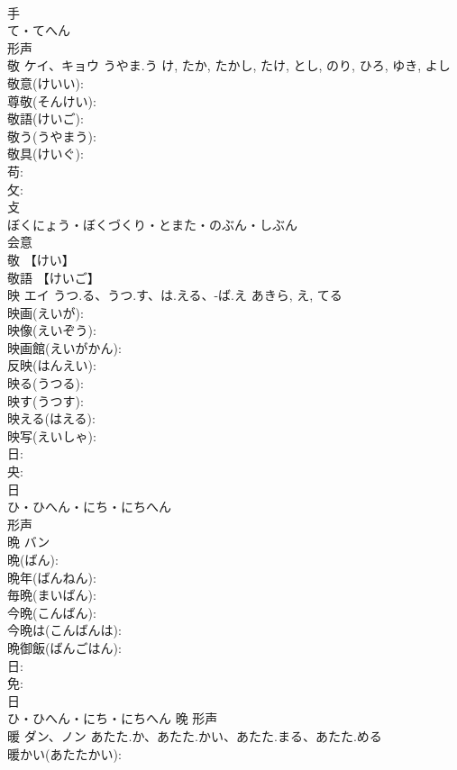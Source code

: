 \documentclass[8pt]{extreport}
\begin{document}
\begin{CJK}{UTF8}{min}
\\	手	
\\	て・てへん	
\\	形声 
\\	敬	ケイ、キョウ	うやま.う	け, たか, たかし, たけ, とし, のり, ひろ, ゆき, よし	
\\	敬意(けいい): 
\\	尊敬(そんけい): 
\\	敬語(けいご): 
\\	敬う(うやまう): 
\\	敬具(けいぐ): 
\\	苟: 
\\	攵: 
\\	攴	
\\	ぼくにょう・ぼくづくり・とまた・のぶん・しぶん	
\\	会意 
\\	敬 【けい】 
\\	敬語 【けいご】 
\\	映	エイ	うつ.る、うつ.す、は.える、-ば.え	あきら, え, てる	
\\	映画(えいが): 
\\	映像(えいぞう): 
\\	映画館(えいがかん): 
\\	反映(はんえい): 
\\	映る(うつる): 
\\	映す(うつす): 
\\	映える(はえる): 
\\	映写(えいしゃ): 
\\	日: 
\\	央: 
\\	日	
\\	ひ・ひへん・にち・にちへん	
\\	形声 
\\	晩	バン			
\\	晩(ばん): 
\\	晩年(ばんねん): 
\\	毎晩(まいばん): 
\\	今晩(こんばん): 
\\	今晩は(こんばんは): 
\\	晩御飯(ばんごはん): 
\\	日: 
\\	免: 
\\	日	
\\	ひ・ひへん・にち・にちへん	晚	形声 
\\	暖	ダン、ノン	あたた.か、あたた.かい、あたた.まる、あたた.める		
\\	暖かい(あたたかい): 

\end{CJK}
\end{document}
